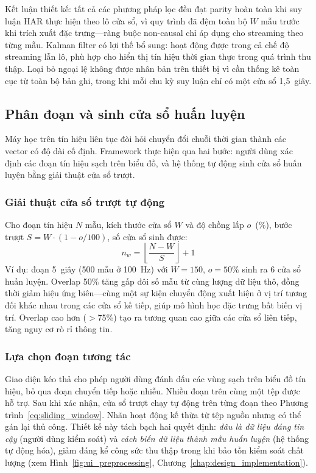 Kết luận thiết kế: tất cả các phương pháp lọc đều đạt parity hoàn toàn khi suy luận HAR thực hiện theo lô cửa sổ, vì quy trình đã đệm toàn bộ $W$ mẫu trước khi trích xuất đặc trưng---ràng buộc non-causal chỉ áp dụng cho streaming theo từng mẫu. Kalman filter có lợi thế bổ sung: hoạt động được trong cả chế độ streaming lẫn lô, phù hợp cho hiển thị tín hiệu thời gian thực trong quá trình thu thập. Loại bỏ ngoại lệ không được nhân bản trên thiết bị vì cần thống kê toàn cục từ toàn bộ bản ghi, trong khi mỗi chu kỳ suy luận chỉ có một cửa sổ 1,5~giây.

\subsection{Phân đoạn và sinh cửa sổ huấn luyện}
\label{sec:windowing_generation}

Máy học trên tín hiệu liên tục đòi hỏi chuyển đổi chuỗi thời gian thành các vector có độ dài cố định. Framework thực hiện qua hai bước: người dùng xác định các đoạn tín hiệu sạch trên biểu đồ, và hệ thống tự động sinh cửa sổ huấn luyện bằng giải thuật cửa sổ trượt.

\subsubsection{Giải thuật cửa sổ trượt tự động}

Cho đoạn tín hiệu $N$ mẫu, kích thước cửa sổ $W$ và độ chồng lấp $o$~(\%), bước trượt $S = W \cdot (1 - o/100)$, số cửa sổ sinh được:
\begin{equation}
    n_w = \left\lfloor \frac{N - W}{S} \right\rfloor + 1
    \label{eq:sliding_window}
\end{equation}
Ví dụ: đoạn 5~giây (500 mẫu ở 100~Hz) với $W = 150$, $o = 50\%$ sinh ra 6 cửa sổ huấn luyện. Overlap 50\% tăng gấp đôi số mẫu từ cùng lượng dữ liệu thô, đồng thời giảm hiệu ứng biên---cùng một sự kiện chuyển động xuất hiện ở vị trí tương đối khác nhau trong các cửa sổ kế tiếp, giúp mô hình học đặc trưng bất biến vị trí. Overlap cao hơn ($>$75\%) tạo ra tương quan cao giữa các cửa sổ liên tiếp, tăng nguy cơ rò rỉ thông tin.

\subsubsection{Lựa chọn đoạn tương tác}

Giao diện kéo thả cho phép người dùng đánh dấu các vùng sạch trên biểu đồ tín hiệu, bỏ qua đoạn chuyển tiếp hoặc nhiễu. Nhiều đoạn trên cùng một tệp được hỗ trợ. Sau khi xác nhận, cửa sổ trượt chạy tự động trên từng đoạn theo Phương trình~\ref{eq:sliding_window}. Nhãn hoạt động kế thừa từ tệp nguồn nhưng có thể gán lại thủ công. Thiết kế này tách bạch hai quyết định: \textit{đâu là dữ liệu đáng tin cậy} (người dùng kiểm soát) và \textit{cách biến dữ liệu thành mẫu huấn luyện} (hệ thống tự động hóa), giảm đáng kể công sức thu thập trong khi bảo tồn kiểm soát chất lượng (xem Hình~\ref{fig:ui_preprocessing}, Chương~\ref{chap:design_implementation}).

